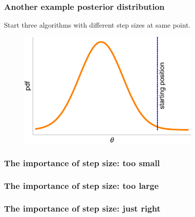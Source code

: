 \documentclass[handout]{beamer}
\begin{document}
\begin{frame}
\frametitle{Another example posterior distribution}
Start three algorithms with different step sizes at same point.

\begin{figure}[ht]
\centerline{\includegraphics[width=0.8\textwidth]{animations_figures/lec4_stepSizeStart2.pdf}}
\end{figure}

\end{frame}

\begin{frame}
\frametitle{The importance of step size: too small}

\begin{figure}[t]
\centerline{}
\end{figure}

\end{frame}

\begin{frame}
\frametitle{The importance of step size: too large}

\begin{figure}[t]
\centerline{}
\end{figure}

\end{frame}

\begin{frame}
\frametitle{The importance of step size: just right}

\begin{figure}[t]
\centerline{}
\end{figure}

\end{frame}
\end{document}
